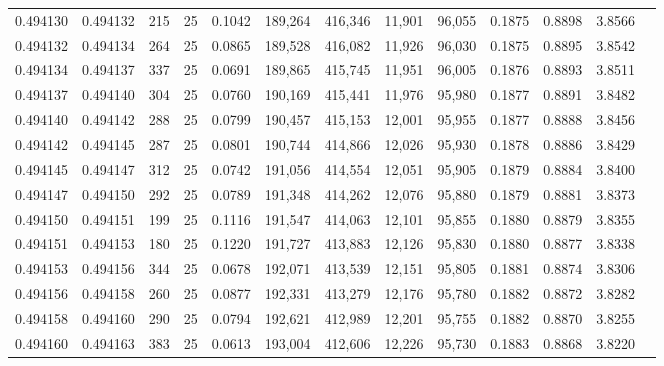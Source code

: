 \begin{tabular}{rrrrrrrrrrrrr}
0.494130 & 0.494132 &   215 &  25 &                                     0.1042 & 189,264 & 416,346 &  11,901 &  96,055 & 0.1875 & 0.8898 & 3.8566 \\
0.494132 & 0.494134 &   264 &  25 &                                     0.0865 & 189,528 & 416,082 &  11,926 &  96,030 & 0.1875 & 0.8895 & 3.8542 \\
0.494134 & 0.494137 &   337 &  25 &                                     0.0691 & 189,865 & 415,745 &  11,951 &  96,005 & 0.1876 & 0.8893 & 3.8511 \\
0.494137 & 0.494140 &   304 &  25 &                                     0.0760 & 190,169 & 415,441 &  11,976 &  95,980 & 0.1877 & 0.8891 & 3.8482 \\
0.494140 & 0.494142 &   288 &  25 &                                     0.0799 & 190,457 & 415,153 &  12,001 &  95,955 & 0.1877 & 0.8888 & 3.8456 \\
0.494142 & 0.494145 &   287 &  25 &                                     0.0801 & 190,744 & 414,866 &  12,026 &  95,930 & 0.1878 & 0.8886 & 3.8429 \\
0.494145 & 0.494147 &   312 &  25 &                                     0.0742 & 191,056 & 414,554 &  12,051 &  95,905 & 0.1879 & 0.8884 & 3.8400 \\
0.494147 & 0.494150 &   292 &  25 &                                     0.0789 & 191,348 & 414,262 &  12,076 &  95,880 & 0.1879 & 0.8881 & 3.8373 \\
0.494150 & 0.494151 &   199 &  25 &                                     0.1116 & 191,547 & 414,063 &  12,101 &  95,855 & 0.1880 & 0.8879 & 3.8355 \\
0.494151 & 0.494153 &   180 &  25 &                                     0.1220 & 191,727 & 413,883 &  12,126 &  95,830 & 0.1880 & 0.8877 & 3.8338 \\
0.494153 & 0.494156 &   344 &  25 &                                     0.0678 & 192,071 & 413,539 &  12,151 &  95,805 & 0.1881 & 0.8874 & 3.8306 \\
0.494156 & 0.494158 &   260 &  25 &                                     0.0877 & 192,331 & 413,279 &  12,176 &  95,780 & 0.1882 & 0.8872 & 3.8282 \\
0.494158 & 0.494160 &   290 &  25 &                                     0.0794 & 192,621 & 412,989 &  12,201 &  95,755 & 0.1882 & 0.8870 & 3.8255 \\
0.494160 & 0.494163 &   383 &  25 &                                     0.0613 & 193,004 & 412,606 &  12,226 &  95,730 & 0.1883 & 0.8868 & 3.8220 \\

\end{tabular}
